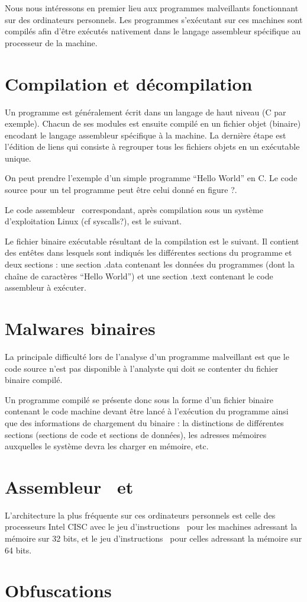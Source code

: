 
Nous nous intéressons en premier lieu aux programmes malveillants fonctionnant sur des ordinateurs personnels.
Les programmes s'exécutant sur ces machines sont compilés afin d'être exécutés nativement dans le langage assembleur spécifique au processeur de la machine.

\section{Compilation et décompilation}
Un programme est généralement écrit dans un langage de haut niveau (C par exemple). Chacun de ses modules est ensuite compilé en un fichier objet (binaire) encodant le langage assembleur spécifique à la machine. La dernière étape est l'édition de liens qui consiste à regrouper tous les fichiers objets en un exécutable unique.

On peut prendre l'exemple d'un simple programme ``Hello World'' en C. Le code source pour un tel programme peut être celui donné en figure ?.

Le code assembleur \xq\ correspondant, après compilation sous un système d'exploitation Linux (cf syscalls?), est le suivant.

Le fichier binaire exécutable résultant de la compilation est le suivant. Il contient des entêtes dans lesquels sont indiqués les différentes sections du programme et deux sections : une section .data contenant les données du programmes (dont la chaîne de caractères ``Hello World'') et une section .text contenant le code assembleur à exécuter.
\section{Malwares binaires}
La principale difficulté lors de l'analyse d'un programme malveillant est que le code source n'est pas disponible à l'analyste qui doit se contenter du fichier binaire compilé.

Un programme compilé se présente donc sous la forme d'un fichier binaire contenant le code machine devant être lancé à l'exécution du programme ainsi que des informations de chargement du binaire : la distinctions de différentes sections (sections de code et sections de données), les adresses mémoires auxquelles le système devra les charger en mémoire, etc.

\section{Assembleur \xq\ et \xs}
L'architecture la plus fréquente sur ces ordinateurs personnels est celle des processeurs Intel CISC avec le jeu d'instructions \xq\ pour les machines adressant la mémoire sur 32 bits, et le jeu d'instructions \xs\ pour celles adressant la mémoire sur 64 bits.

\section{Obfuscations}
